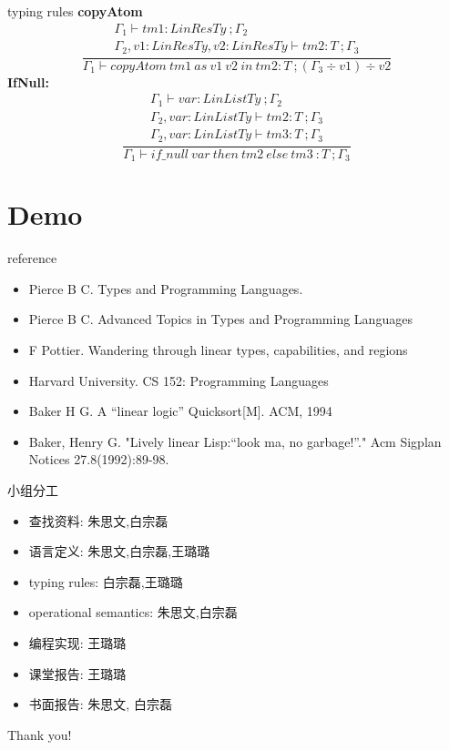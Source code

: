 \documentclass[10pt]{beamer}
\begin{document}
\begin{frame}[fragile]{typing rules}
\textbf{copyAtom}
\[
	\frac{
		\begin{array}{c}
			\Gamma_1 \vdash tm1 : LinResTy\ ; \Gamma_2 \\
			\Gamma_2, v1: LinResTy, v2: LinResTy \vdash tm2 : T\ ; \Gamma_3
		\end{array}
	}{
		\Gamma_1 \vdash copyAtom\ tm1\ as\ v1\ v2\ in\ tm2 : T\ ; (\Gamma_3 \div v1) \div v2
	}
\]
\textbf{IfNull:}
\[
	\frac{
		\begin{array}{c}
			\Gamma_1 \vdash var : LinListTy\ ; \Gamma_2 \\
			\Gamma_2, var : LinListTy \vdash tm2: T\ ; \Gamma_3 \\
			\Gamma_2, var : LinListTy \vdash tm3: T\ ; \Gamma_3
		\end{array}
	}{
		\Gamma_1 \vdash if\_null\ var\ then\ tm2\ else\ tm3\ : T\ ; \Gamma_3
	}
\]

\end{frame}



\section{Demo}

\begin{frame}{reference}
	\begin{itemize}
		\item Pierce B C. Types and Programming Languages. 
		\item Pierce B C. Advanced Topics in Types and Programming Languages 
		\item F Pottier. Wandering through linear types, capabilities, and regions
		\item Harvard University. CS 152: Programming Languages
		\item Baker H G. A “linear logic” Quicksort[M]. ACM, 1994
		\item Baker, Henry G. "Lively linear Lisp:“look ma, no garbage!”." Acm Sigplan Notices 27.8(1992):89-98.
	\end{itemize}
\end{frame}


\begin{frame}{小组分工}
	\begin{itemize}
		\item 查找资料: 朱思文,白宗磊
		\item 语言定义: 朱思文,白宗磊,王璐璐
		\item typing rules: 白宗磊,王璐璐
		\item operational semantics: 朱思文,白宗磊
		\item 编程实现: 王璐璐
		\item 课堂报告: 王璐璐
		\item 书面报告: 朱思文, 白宗磊 
	\end{itemize}
\end{frame}

\begin{frame}[standout]
	Thank you!
\end{frame}


\end{document}
